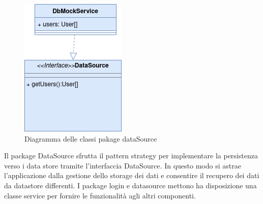 \begin{figure}[H]
    \centering
 \includegraphics[scale=0.7]{resources/diagramma_package-dataSource.drawio.png}
   \caption{Diagramma delle classi pakage dataSource}
\end{figure}
Il package DataSource sfrutta il pattern strategy per implementare la persistenza verso i data store tramite l'interfaccia DataSource. In questo modo si astrae l'applicazione dalla gestione dello storage dei dati e consentire il recupero dei dati da datastore differenti.
\newline
I package login e datasource mettono ha disposizione una classe service per fornire le funzionalità agli altri componenti.




